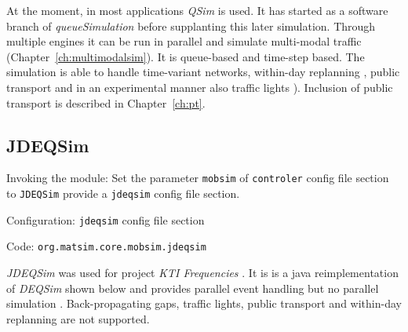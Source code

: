 At the moment, in most applications \emph{QSim} \citep[][]{Dobler_TechRep_IVT_2011, Dobler_STRC_2010} is used. It has started as a software branch of \emph{queueSimulation} before supplanting this later simulation. Through multiple engines it can be run in parallel and simulate multi-modal traffic (Chapter~\ref{ch:multimodalsim}). It is queue-based and time-step based. The simulation is able to handle time-variant networks, within-day replanning \citep[][]{Dobler_TechRep_IVT_2009}, public transport \citep[][]{Rieser_PhDThesis_2010} and in an experimental manner also traffic lights \citep[][]{Neumann_MastersThesis_2008}). Inclusion of public transport is described in Chapter~\ref{ch:pt}.

\subsection{JDEQSim}
\label{sec:jdeqsim}
\begin{compactitem}
\item Invoking the module: Set the parameter \lstinline|mobsim| of \lstinline|controler| config file section to \lstinline|JDEQSim| provide a \lstinline|jdeqsim| config file section.
\item Configuration: \lstinline|jdeqsim| config file section
\item Code: \lstinline|org.matsim.core.mobsim.jdeqsim|
\end{compactitem}

\emph{JDEQSim} \citep[][]{WaraichEtAl_TechRep_IVT_2009, WaraichEtAl_STRC_2009} was used for project \emph{KTI Frequencies} \citep[][]{BalmerEtAl_ResRep_datapuls_2010}. It is is a java reimplementation of \emph{DEQSim} shown below \citep[][]{WaraichEtAl_STRC_2009, CharyparEtAl_TRR_2007, CharyparEtAl_TRB_2009} and provides parallel event handling but no parallel simulation \citep[][p.11]{BalmerEtAl_ResRep_datapuls_2010}. Back-propagating gaps, traffic lights, public transport and within-day replanning are not supported.


